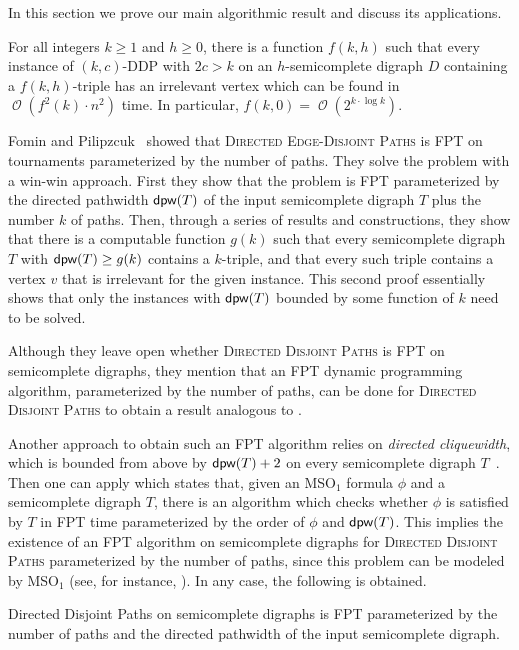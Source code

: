 \documentclass[a4paper,UKenglish,cleveref, autoref, thm-restate]{lipics-v2021}
\DeclareMathOperator{\dpw}{\text{\sf dpw}\xspace}
\DeclareMathOperator{\Ocal}{\mathcal{O}\xspace}
\renewcommand{\FPT}{{\sf FPT}\xspace}
\begin{document}
In this section we prove our main algorithmic result and discuss its applications.
\begin{theorem}\label{thm:FPT-large-congestion}
  For all integers $k \geq 1$ and $h \geq 0$, there is a function $f(k,h)$ such
  that every instance of $(k,c)$-\textsc{DDP} with $2c > k$ on an
  $h$-semicomplete digraph $D$ containing a $f(k,h)$-triple has an irrelevant
  vertex which can be found in $\Ocal(f^2(k) \cdot n^2)$ time.
  In particular, $f(k,0) = \Ocal(2^{k\cdot \log k})$.
\end{theorem}

Fomin and Pilipzcuk~\cite[Theorem 6.3]{FominP19} showed that \textsc{Directed Edge-Disjoint Paths} is \FPT  on tournaments parameterized by the number of paths.
They solve the problem with a win-win approach.
First they show that the problem is \FPT parameterized by the directed pathwidth $\dpw(T)$ of the input semicomplete digraph $T$ plus the number $k$ of paths.
Then, through a series of results and constructions, they show that there is a computable function $g(k)$ such that every semicomplete digraph $T$ with $\dpw(T) \geq g(k)$ contains a $k$-triple, and that every such triple contains a vertex $v$ that is irrelevant for the given instance.
This second proof essentially shows that only the instances with $\dpw(T)$ bounded by some function of $k$ need to be solved.

Although they leave open whether \textsc{Directed Disjoint Paths} is \FPT on semicomplete digraphs, they mention that an \FPT dynamic programming algorithm, parameterized by the number of paths, can be done for \textsc{Directed Disjoint Paths} to obtain a result analogous to \cite[Theorem 6.3]{FominP19}.

Another approach to obtain such an \FPT algorithm relies on \emph{directed cliquewidth}, which is bounded from above by $\dpw(T) + 2$ on every semicomplete digraph $T$~\cite[Lemma 2.14]{FominP19}.
Then one can apply \cite[Theorem 2.16]{FominP19} which states that, given an MSO$_1$ formula $\phi$ and a semicomplete digraph $T$, there is an algorithm  which checks whether $\phi$ is satisfied by $T$ in \FPT time parameterized by the order of $\phi$ and $\dpw(T)$.
This implies the existence of an \FPT algorithm on semicomplete digraphs for \textsc{Directed Disjoint Paths} parameterized by the number of paths, since this problem can be modeled by MSO$_1$ (see, for instance, \cite[Proposition 4.7]{GANIAN201488}).
In any case, the following is obtained.

\begin{proposition}\label{prop:ddp-fpt-fomin-pilipzcuk}
{\sc Directed Disjoint Paths} on semicomplete digraphs is \FPT parameterized by the number of paths and the directed pathwidth of the input semicomplete digraph.
\end{proposition}
\end{document}
